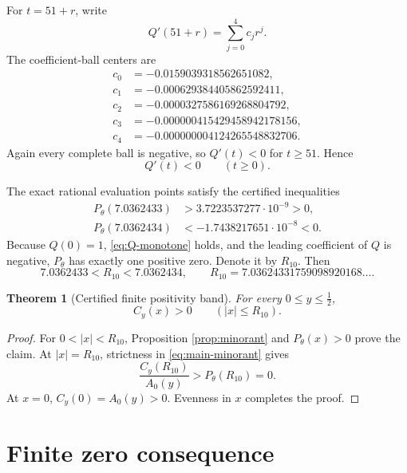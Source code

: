 \documentclass[11pt]{amsart}
\newtheorem{theorem}{Theorem}[section]
\theoremstyle{remark}
\begin{document}
For $t=51+r$, write
\[
Q'(51+r)=\sum_{j=0}^{4}c_jr^j.
\]
The coefficient-ball centers are
\begin{equation}\label{eq:tail-coefficients}
\begin{aligned}
c_0&=-0.0159039318562651082,\\
c_1&=-0.000629384405862592411,\\
c_2&=-0.0000327586169268804792,\\
c_3&=-0.000000415429458942178156,\\
c_4&=-0.000000004124265548832706.
\end{aligned}
\end{equation}
Again every complete ball is negative, so $Q'(t)<0$ for $t\geq51$.  Hence
\begin{equation}\label{eq:Q-monotone}
Q'(t)<0\qquad(t\geq0).
\end{equation}

The exact rational evaluation points satisfy the certified inequalities
\begin{align}
P_\theta(7.0362433)&>3.7223537277\cdot10^{-9}>0,
\label{eq:root-lower}\\
P_\theta(7.0362434)&<-1.7438217651\cdot10^{-8}<0.
\label{eq:root-upper}
\end{align}
Because $Q(0)=1$, \eqref{eq:Q-monotone} holds, and the leading coefficient
of $Q$ is negative, $P_\theta$ has exactly one positive zero.  Denote it by
$R_{10}$.  Then
\begin{equation}\label{eq:R10}
7.0362433<R_{10}<7.0362434,
\qquad
R_{10}=7.03624331759098920168\ldots.
\end{equation}

\begin{theorem}[Certified finite positivity band]\label{thm:finite-band}
For every $0\leq y\leq\frac12$,
\begin{equation}\label{eq:finite-band}
C_y(x)>0\qquad(|x|\leq R_{10}).
\end{equation}
\end{theorem}

\begin{proof}
For $0<|x|<R_{10}$, Proposition \ref{prop:minorant} and
$P_\theta(x)>0$ prove the claim.  At $|x|=R_{10}$, strictness in
\eqref{eq:main-minorant} gives
\[
\frac{C_y(R_{10})}{A_0(y)}>P_\theta(R_{10})=0.
\]
At $x=0$, $C_y(0)=A_0(y)>0$.  Evenness in $x$ completes the proof.
\end{proof}

\section{Finite zero consequence}
\end{document}
